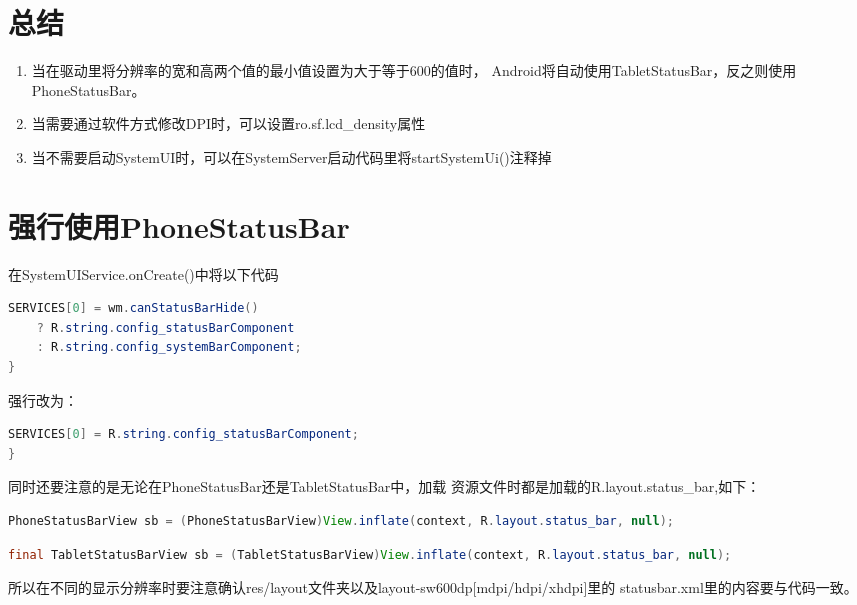 \documentclass[a4paper,11pt]{article}
\begin{document}
\begin{CJK*}{UTF8}{gbsn}
\section{总结}
    \begin{enumerate}
    \item 当在驱动里将分辨率的宽和高两个值的最小值设置为大于等于600的值时，
        Android将自动使用TabletStatusBar，反之则使用PhoneStatusBar。

    \item 当需要通过软件方式修改DPI时，可以设置ro.sf.lcd\_density属性
    \item 当不需要启动SystemUI时，可以在SystemServer启动代码里将startSystemUi()注释掉
    \end{enumerate}



\section{强行使用PhoneStatusBar}
在SystemUIService.onCreate()中将以下代码
\begin{lstlisting}[language=JAVA]
SERVICES[0] = wm.canStatusBarHide()
    ? R.string.config_statusBarComponent
    : R.string.config_systemBarComponent;
}
\end{lstlisting}
强行改为：
\begin{lstlisting}[language=JAVA]
SERVICES[0] = R.string.config_statusBarComponent;
}
\end{lstlisting}
    同时还要注意的是无论在PhoneStatusBar还是TabletStatusBar中，加载
    资源文件时都是加载的R.layout.status\_bar,如下：
\begin{lstlisting}[language=JAVA]
PhoneStatusBarView sb = (PhoneStatusBarView)View.inflate(context, R.layout.status_bar, null);
\end{lstlisting}
\begin{lstlisting}[language=JAVA]
final TabletStatusBarView sb = (TabletStatusBarView)View.inflate(context, R.layout.status_bar, null);
\end{lstlisting}
    所以在不同的显示分辨率时要注意确认res/layout文件夹以及layout-sw600dp[mdpi/hdpi/xhdpi]里的
    statusbar.xml里的内容要与代码一致。
\end{CJK*} %
\end{document}

